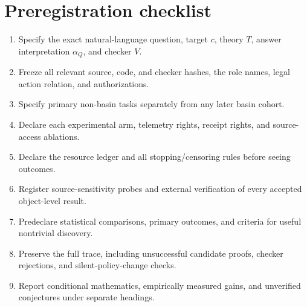 \documentclass[11pt,letterpaper]{article}
\begin{document}
\section{Preregistration checklist}
\begin{enumerate}
\item Specify the exact natural-language question, target $c$, theory $T$, answer interpretation $\alpha_Q$, and checker $V$.
\item Freeze all relevant source, code, and checker hashes, the role names, legal action relation, and authorizations.
\item Specify primary non-basin tasks separately from any later basin cohort.
\item Declare each experimental arm, telemetry rights, receipt rights, and source-access ablations.
\item Declare the resource ledger and all stopping/censoring rules before seeing outcomes.
\item Register source-sensitivity probes and external verification of every accepted object-level result.
\item Predeclare statistical comparisons, primary outcomes, and criteria for useful nontrivial discovery.
\item Preserve the full trace, including unsuccessful candidate proofs, checker rejections, and silent-policy-change checks.
\item Report conditional mathematics, empirically measured gains, and unverified conjectures under separate headings.
\end{enumerate}
\end{document}
